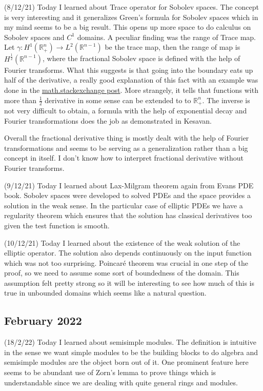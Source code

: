 \documentclass[12pt,a4paper]{article}
\newcommand{\R}{\mathbb{R}}
\begin{document}
(8/12/21) Today I learned about Trace operator for Sobolev spaces. The concept is very interesting and it generalizes Green's formula for Sobolev spaces which in my mind seems to be a big result. This opens up more space to do calculus on Sobolev spaces and $C^1$ domains. A peculiar finding was the range of Trace map. Let $\gamma : H^1(\R^n_+) \to L^2(\R^{n-1})$ be the trace map, then the range of map is $H^{\frac{1}{2}}(\R^{n-1})$, where the fractional Sobolev space is defined with the help of Fourier transforms. What this suggests is that going into the boundary eats up half of the derivative, a really good explanation of this fact with an example was done in the \href{https://math.stackexchange.com/a/3627476/445705}{math.stackexchange post}. More strangely, it tells that functions with more than $\frac{1}{2}$ derivative in some sense can be extended to to $\R^n_+$. The inverse is not very difficult to obtain, a formula with the help of exponential decay and Fourier transformations does the job as demonstrated in Kesavan. 
   
Overall the fractional derivative thing is mostly dealt with the help of Fourier transformations and seems to be serving as a generalization rather than a big concept in itself. I don't know how to interpret fractional derivative without Fourier transforms. 
   
(9/12/21) Today I learned about Lax-Milgram theorem again from Evans PDE book. Sobolev spaces were developed to solved PDEs and the space provides a solution in the weak sense. In the particular case of elliptic PDEs we have a regularity theorem which ensures that the solution has classical derivatives too given the test function is smooth. 
   
(10/12/21) Today I learned about the existence of the weak solution of the elliptic operator. The solution also depends continuously on the input function which was not too surprising. Poincar\'{e} theorem was crucial in one step of the proof, so we need to assume some sort of boundedness of the domain. This assumption felt pretty strong so it will be interesting to see how much of this is true in unbounded domains which seems like a natural question.
   
\subsection*{February 2022}
   
   
\quad (18/2/22) Today I learned about semisimple modules. The definition is intuitive in the sense we want simple modules to be the building blocks to do algebra and semisimple modules are the object born out of it. One prominent feature here seems to be abundant use of Zorn's lemma to prove things which is understandable since we are dealing with quite general rings and modules.
   	
\end{document}

